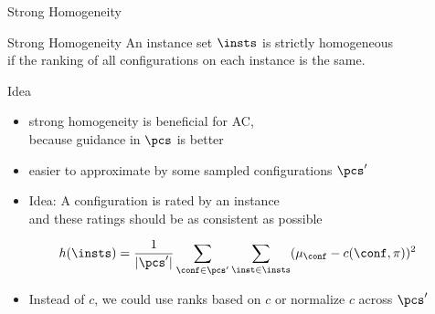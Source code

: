 \begin{frame}[c]{Strong Homogeneity}

\begin{block}{Strong Homogeneity}
An instance set $\insts$ is strictly homogeneous\\
if the ranking of all configurations on each instance is the same.
\end{block}

\pause

\begin{block}{Idea }
\begin{itemize}
  \item strong homogeneity is beneficial for AC,\\ because guidance in $\pcs$ is better 
  \item easier to approximate by some sampled configurations $\pcs'$
  \item Idea: A configuration is rated by an instance\\ and these ratings should be as consistent as possible
\end{itemize}

\begin{equation}
h(\insts) = \frac{1}{|\pcs'|} \sum_{\conf \in \pcs'} \sum_{\inst \in \insts} (\mu_\conf - c (\conf, \pi))^2 \nonumber
\end{equation}

\pause
\begin{itemize}
  \item Instead of $c$, we could use ranks based on $c$ or normalize $c$ across $\pcs'$
\end{itemize}

\end{block}

\end{frame}
